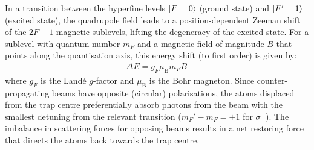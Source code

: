 \documentclass[../Thesis-IJspeert.tex]{subfiles}
\begin{document}
In a transition between the hyperfine levels $\ket{F=0}$ (ground state) and $\ket{F'=1}$ (excited state), the quadrupole field leads to a position-dependent Zeeman shift of the $2F+1$ magnetic sublevels, lifting the degeneracy of the excited state. For a sublevel with quantum number $m_F$ and a magnetic field of magnitude $B$ that points along the quantisation axis, this energy shift (to first order) is given by:
\begin{align}
	\Delta E = g_F\mu_\mathrm{B} m_F B\,
\end{align}
where $g_F$ is the Landé $g$-factor and $\mu_\mathrm{B}$ is the Bohr magneton. Since counter-propagating beams have opposite (circular) polarisations, the atoms displaced from the trap centre preferentially absorb photons from the beam with the smallest detuning from the relevant transition ($m_F'-m_F= \pm1$ for $\sigma_\pm$). The imbalance in scattering forces for opposing beams results in a net restoring force that directs the atoms back towards the trap centre.
\end{document}
